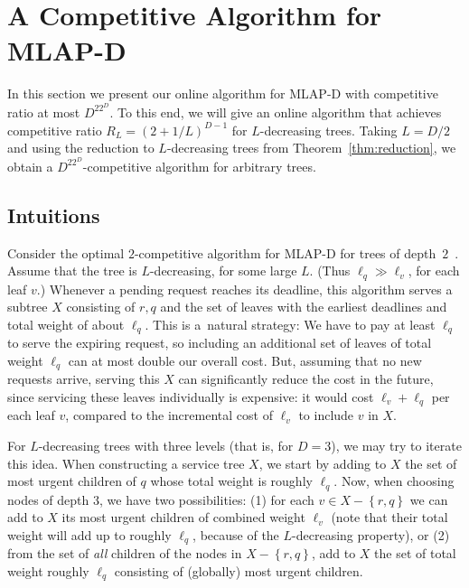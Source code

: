 \documentclass[a4paper]{article}
\newcommand{\braced}[1]{{ \left\{ #1 \right\} }}
\newcommand{\length}{\ell}
\newcommand{\MLAPD}{\mbox{\rm\textsf{MLAP-D}}}
\begin{document}
\section{A Competitive Algorithm for {\MLAPD}}
\label{sec: competitive algorithm for mlap-d}


In this section we present our online algorithm for {\MLAPD} with 
competitive ratio at most $D^22^D$.
To this end, we will give an online algorithm that achieves
competitive ratio $R_L = (2+1/L)^{D-1}$ for $L$-decreasing trees.
Taking $L = D/2$ and using the reduction to $L$-decreasing trees from
Theorem~\ref{thm:reduction}, we obtain a
$D^22^D$-competitive algorithm for arbitrary trees.


\subsection{Intuitions} 

Consider the optimal $2$-competitive algorithm for {\MLAPD} for
trees of depth~$2$~\cite{jrp-soda-2014}. Assume that the tree is $L$-decreasing, 
for some large $L$. (Thus $\length_q \gg \length_v$, for each leaf $v$.)
Whenever a pending request
reaches its deadline, this algorithm serves a subtree $X$ consisting
of $r,q$ and the set of leaves with the earliest deadlines and total
weight of about $\length_q$.  This is a~natural strategy: We
have to pay at least $\length_q$ to serve the expiring request, so
including an additional set of leaves of total weight $\length_q$ can
at most double our overall cost. But, assuming that no new requests arrive,
serving this $X$ can significantly reduce the cost in the future,
since servicing these leaves individually is expensive: it would
cost $\length_v+\length_q$ per each leaf $v$, compared to the
incremental cost of $\length_v$ to include $v$ in $X$.

For $L$-decreasing trees with three levels (that is, for $D=3$), 
we may try to iterate this idea. 
When constructing a service tree $X$, we start by adding to $X$
the set of most urgent children of $q$ whose total weight is roughly
$\length_q$.  Now, when choosing nodes of depth $3$, we have two
possibilities: (1) for each $v\in X-\braced{r,q}$ we can add to $X$
its most urgent children of combined weight $\length_v$ (note that
their total weight will add up to roughly $\length_q$, because of the
$L$-decreasing property), or (2) from the set of \emph{all} children
of the nodes in $X-\braced{r,q}$, add to $X$ the set of total weight
roughly $\length_q$ consisting of (globally) most urgent children. 
\end{document}
